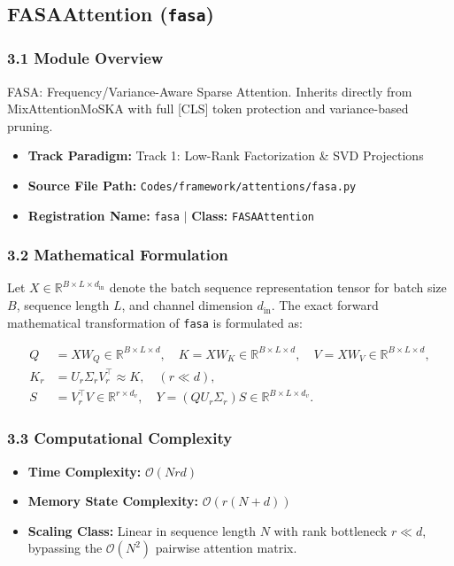 \subsection{FASAAttention (\texttt{fasa})}
\label{sec:app_module_fasa}

\subsubsection*{3.1 Module Overview}
FASA: Frequency/Variance-Aware Sparse Attention. Inherits directly from MixAttentionMoSKA with full [CLS] token protection and variance-based pruning.
\begin{itemize}
    \item \textbf{Track Paradigm:} Track 1: Low-Rank Factorization \& SVD Projections
    \item \textbf{Source File Path:} \texttt{Codes/framework/attentions/fasa.py}
    \item \textbf{Registration Name:} \texttt{fasa} $\mid$ \textbf{Class:} \texttt{FASAAttention}
\end{itemize}

\subsubsection*{3.2 Mathematical Formulation}
Let $X \in \mathbb{R}^{B \times L \times d_{\text{in}}}$ denote the batch sequence representation tensor for batch size $B$, sequence length $L$, and channel dimension $d_{\text{in}}$. The exact forward mathematical transformation of \texttt{fasa} is formulated as:

\begin{align}
Q &= X W_Q \in \mathbb{R}^{B \times L \times d}, \quad K = X W_K \in \mathbb{R}^{B \times L \times d}, \quad V = X W_V \in \mathbb{R}^{B \times L \times d}, \\
K_r &= U_r \Sigma_r V_r^\top \approx K, \quad (r \ll d), \\
S &= V_r^\top V \in \mathbb{R}^{r \times d_v}, \quad Y = (Q U_r \Sigma_r) S \in \mathbb{R}^{B \times L \times d_v}.
\end{align}


\subsubsection*{3.3 Computational Complexity}
\begin{itemize}
    \item \textbf{Time Complexity:} $\mathcal{O}(N r d)$
    \item \textbf{Memory State Complexity:} $\mathcal{O}(r(N + d))$
    \item \textbf{Scaling Class:} Linear in sequence length $N$ with rank bottleneck $r \ll d$, bypassing the $\mathcal{O}(N^2)$ pairwise attention matrix.
\end{itemize}

